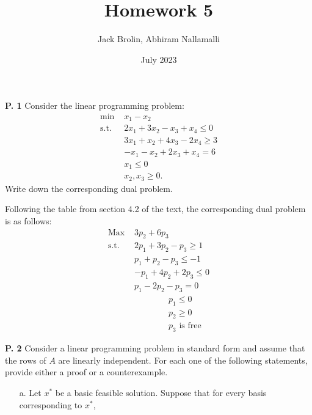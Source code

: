 \documentclass{article}
\title{Homework 5}
\author{Jack Brolin, Abhiram Nallamalli}
\date{July 2023}
\begin{document}
\maketitle

\begin{jacklist}
    \begin{framed} 
    \item [\textbf{P. 1}] Consider the linear programming problem: 
        \begin{align*}
            \text{min }  & x_{1}-x_{2} \\
            \text{s.t. } & 2 x_{1}+3 x_{2}-x_{3}+x_{4} \leq 0 \\
                         & 3 x_{1}+x_{2}+4 x_{3}-2 x_{4} \geq 3 \\
                         & -x_{1}-x_{2}+2 x_{3}+x_{4}=6 \\
                         & x_{1} \leq 0 \\
                         & x_{2}, x_{3} \geq 0 .
        \end{align*} 
        Write down the corresponding dual problem.
    \end{framed}
    Following the table from section 4.2 of the text, the corresponding dual problem is as follows:
    \begin{align*}
        \text{Max } & 3p_2 + 6p_3 \\
        \text{s.t. } & 2p_1 + 3p_2 - p_3 \geq 1\\
                     & p_1 + p_2 - p_3 \leq -1 \\
                     &-p_1 + 4p_2 + 2p_3 \leq 0 \\
                     &p_1 - 2p_2 - p_3 = 0 \\
                     &\qquad \qquad  p_1 \leq 0 \\
                     &\qquad \qquad  p_2 \geq 0 \\
                     & \qquad \qquad p_3 \text{ is free}
    \end{align*}
\newpage
    \begin{framed} 
    \item [\textbf{P. 2}] Consider a linear programming problem in standard form and assume that the rows of $A$ are 
        linearly independent. For each one of the following statements, provide either a proof or a counterexample.
        \begin{itemize}
            \item [a.] Let $x^{*}$ be a basic feasible solution. Suppose that for every basis corresponding to $x^{*}$, 

\end{itemize}
\end{framed}
\end{jacklist}
\end{document}
